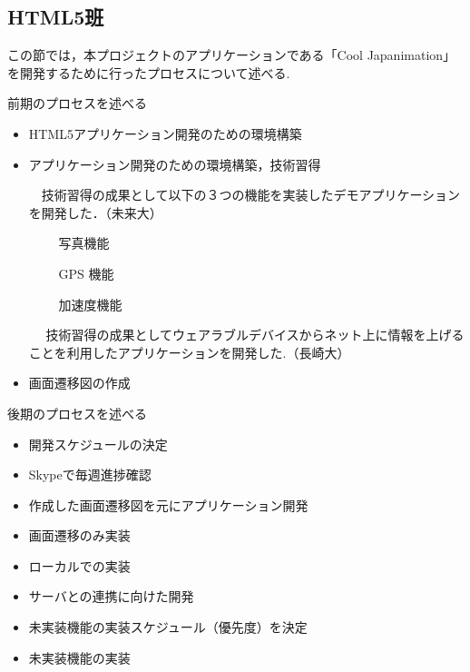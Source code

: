 \subsection{HTML5班}
\par この節では，本プロジェクトのアプリケーションである「Cool Japanimation」を開発するために行ったプロセスについて述べる.

\par 前期のプロセスを述べる
\begin{itemize}
\item HTML5アプリケーション開発のための環境構築
\item アプリケーション開発のための環境構築，技術習得
\par 　技術習得の成果として以下の３つの機能を実装したデモアプリケーションを開発した．（未来大）
\par 　　 写真機能
\par 　　 GPS 機能
\par　  　加速度機能
\par　 技術習得の成果としてウェアラブルデバイスからネット上に情報を上げることを利用したアプリケーションを開発した.（長崎大）
\item 画面遷移図の作成
\end{itemize}

\par 後期のプロセスを述べる
\begin{itemize}
\item 開発スケジュールの決定
\item Skypeで毎週進捗確認
\item 作成した画面遷移図を元にアプリケーション開発
\item 画面遷移のみ実装
\item ローカルでの実装
\item サーバとの連携に向けた開発
\item 未実装機能の実装スケジュール（優先度）を決定
\item 未実装機能の実装
\end{itemize}

